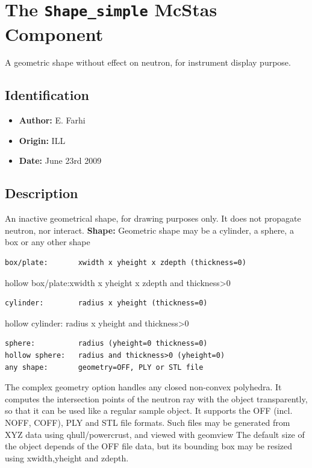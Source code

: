 \section{The \texttt{Shape\_simple} McStas Component}
A geometric shape without effect on neutron, for instrument display purpose.

\subsection*{Identification}
\begin{itemize}
  \item \textbf{Author:} E. Farhi
  \item \textbf{Origin:} ILL
  \item \textbf{Date:} June 23rd 2009
\end{itemize}

\subsection*{Description}
An inactive geometrical shape, for drawing purposes only. It does not propagate neutron, nor interact. \textbf{Shape:} Geometric shape may be a cylinder, a sphere, a box or any other shape

\begin{verbatim}
box/plate:       xwidth x yheight x zdepth (thickness=0)
\end{verbatim}

hollow box/plate:xwidth x yheight x zdepth and thickness\textgreater{}0

\begin{verbatim}
cylinder:        radius x yheight (thickness=0)
\end{verbatim}

hollow cylinder: radius x yheight and thickness\textgreater{}0

\begin{verbatim}
sphere:          radius (yheight=0 thickness=0)
hollow sphere:   radius and thickness>0 (yheight=0)
any shape:       geometry=OFF, PLY or STL file
\end{verbatim}

The complex geometry option handles any closed non-convex polyhedra. It computes the intersection points of the neutron ray with the object transparently, so that it can be used like a regular sample object. It supports the OFF (incl. NOFF, COFF), PLY and STL file formats. Such files may be generated from XYZ data using qhull/powercrust, and viewed with geomview The default size of the object depends of the OFF file data, but its bounding box may be resized using xwidth,yheight and zdepth.

